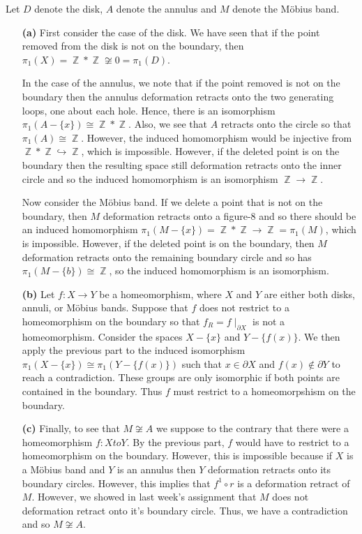 \documentclass{article}
\DeclareMathOperator{\Z}{\mathbb{Z}}
\DeclareMathOperator{\into}{\hookrightarrow}
\newcommand{\exercise}[1]{\noindent{\textbf{Exercise #1:}}}
\begin{document}
\exercise{A1} Let $D$ denote the disk, $A$ denote the annulus and $M$
denote the M\"{o}bius band.
\begin{enumerate}
\item[\textbf{(a)}] First consider the case of the disk. We have seen
  that if the point removed from the disk is not on the boundary, then
  $\pi_1(X) = \Z \ast \Z \not\cong 0 = \pi_1(D)$.

  In the case of the annulus, we note that if the point removed is not
  on the boundary then the annulus deformation retracts onto the two
  generating loops, one about each hole. Hence, there is an
  isomorphism $\pi_1(A - \{x\}) \cong \Z \ast \Z$. Also, we see that
  $A$ retracts onto the circle so that $\pi_1(A) \cong \Z$. However,
  the induced homomorphism would be injective from $\Z \ast \Z \into
  \Z$, which is impossible. However, if the deleted point is on the
  boundary then the resulting space still deformation retracts onto
  the inner circle and so the induced homomorphism is an isomorphism
  $\Z \to \Z$.

  Now consider the M\"{o}bius band. If we delete a point that is not
  on the boundary, then $M$ deformation retracts onto a figure-8 and
  so there should be an induced homomorphism $\pi_1(M - \{x\}) = \Z
  \ast \Z \to \Z = \pi_1(M)$, which is impossible. However, if the
  deleted point is on the boundary, then $M$ deformation retracts onto
  the remaining boundary circle and so has $\pi_1(M - \{b\}) \cong
  \Z$, so the induced homomorphism is an isomorphism.
\item[\textbf{(b)}] Let $f: X \to Y$ be a homeomorphism, where $X$ and
  $Y$ are either both disks, annuli, or M\"{o}bius bands. Suppose that
  $f$ does not restrict to a homeomorphism on the boundary so that
  $f_R = f\mid_{\partial X}$ is not a homeomorphism. Consider the
  spaces $X - \{x\}$ and $Y - \{f(x)\}$. We then apply the previous
  part to the induced isomorphism $\pi_1(X - \{x\}) \cong \pi_1(Y -
  \{f(x)\})$ such that $x \in \partial X$ and $f(x) \not\in \partial
  Y$ to reach a contradiction. These groups are only isomorphic if
  both points are contained in the boundary. Thus $f$ must restrict to
  a homeomorpshism on the boundary.
\item[\textbf{(c)}] Finally, to see that $M \not\cong A$ we suppose to
  the contrary that there were a homeomorphism $f: X to Y$. By the
  previous part, $f$ would have to restrict to a homeomorphism on the
  boundary. However, this is impossible because if $X$ is a M\"{o}bius
  band and $Y$ is an annulus then $Y$ deformation retracts onto its
  boundary circles. However, this implies that $f^1\circ r$ is a
  deformation retract of $M$. However, we showed in last week's
  assignment that $M$ does not deformation retract onto it's boundary
  circle. Thus, we have a contradiction and so $M \not\cong A$.
\end{enumerate}
\end{document}
